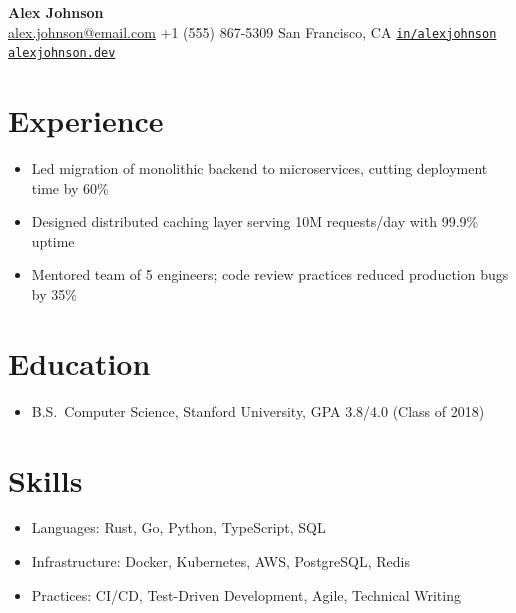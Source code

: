 \documentclass[11pt,a4paper]{article}
\newcommand{\beforeheaderskip}{-15pt}
\newcommand{\normalfontsize}{\small}
\begin{document}
\vspace*{\beforeheaderskip}

\begin{center}
    {\normalfontsize\textbf{\color{headercolor}Alex Johnson}} \\[2pt]
    {\footnotesize
    \href{mailto:alex.johnson@email.com}{alex.johnson@email.com} \quad\textbar\quad
    +1 (555) 867-5309 \quad\textbar\quad
    San Francisco, CA \quad\textbar\quad
    \href{https://linkedin.com/in/alexjohnson}{\texttt{in/alexjohnson}} \quad\textbar\quad
    \href{https://alexjohnson.dev}{\texttt{alexjohnson.dev}}
    }
\end{center}

\vspace{4pt}

\section*{Experience}
\begin{itemize}[leftmargin=1.5em, itemsep=1pt, parsep=0pt, topsep=2pt]
\item Led migration of monolithic backend to microservices, cutting deployment time by 60\%
\item Designed distributed caching layer serving 10M requests/day with 99.9\% uptime
\item Mentored team of 5 engineers; code review practices reduced production bugs by 35\%
\end{itemize}

\section*{Education}
\begin{itemize}[leftmargin=1.5em, itemsep=1pt, parsep=0pt, topsep=2pt]
\item B.S.\ Computer Science, Stanford University, GPA 3.8/4.0 (Class of 2018)
\end{itemize}

\section*{Skills}
\begin{itemize}[leftmargin=1.5em, itemsep=1pt, parsep=0pt, topsep=2pt]
\item Languages: Rust, Go, Python, TypeScript, SQL
\item Infrastructure: Docker, Kubernetes, AWS, PostgreSQL, Redis
\item Practices: CI/CD, Test-Driven Development, Agile, Technical Writing
\end{itemize}
\end{document}
